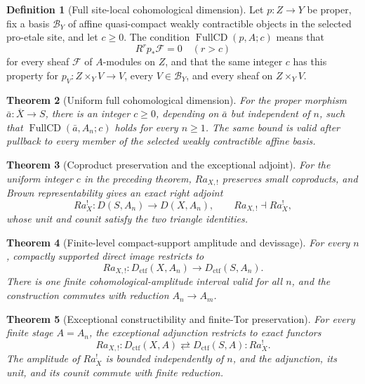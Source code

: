 \documentclass[10pt]{article}
\newtheorem{theorem}{Theorem}[section]
\theoremstyle{definition}
\newtheorem{definition}[theorem]{Definition}
\begin{document}
\begin{definition}[Full site-local cohomological dimension]
Let \(p:Z\to Y\) be proper, fix a basis \(\mathcal B_Y\) of affine
quasi-compact weakly contractible objects in the selected pro-etale site,
and let \(c\ge0\).  The condition \(\operatorname{FullCD}(p,A;c)\) means
that
\[
 R^rp_*\mathcal F=0\quad(r>c)
\]
for every sheaf \(\mathcal F\) of \(A\)-modules on \(Z\), and that the same
integer \(c\) has this property for \(p_V:Z\times_YV\to V\), every
\(V\in\mathcal B_Y\), and every sheaf on \(Z\times_YV\).
\end{definition}

\begin{theorem}[Uniform full cohomological dimension]
For the proper morphism \(\bar a:\overline X\to S\), there is an integer
\(c\geq0\), depending on \(\bar a\) but independent of \(n\), such that
\(\operatorname{FullCD}(\bar a,A_n;c)\) holds for every \(n\geq1\).
The same bound is valid after pullback to every member of the selected
weakly contractible affine basis.
\end{theorem}

\begin{theorem}[Coproduct preservation and the exceptional adjoint]
For the uniform integer \(c\) in the preceding theorem,
\(Ra_{X,!}\) preserves small coproducts,
and Brown representability gives an exact right adjoint
\[
 Ra_X^!:D(S,A_n)\longrightarrow D(X,A_n),
 \qquad Ra_{X,!}\dashv Ra_X^!,
\]
whose unit and counit satisfy the two triangle identities.
\end{theorem}

\begin{theorem}[Finite-level compact-support amplitude and devissage]
For every \(n\), compactly supported direct image restricts to
\[
 Ra_{X,!}:D_{\mathrm{ctf}}(X,A_n)\longrightarrow
          D_{\mathrm{ctf}}(S,A_n).
\]
There is one finite cohomological-amplitude interval valid for all \(n\),
and the construction commutes with reduction \(A_n\to A_m\).
\end{theorem}

\begin{theorem}[Exceptional constructibility and finite-Tor preservation]
For every finite stage \(A=A_n\), the exceptional adjunction
restricts to exact functors
\[
 Ra_{X,!}:D_{\mathrm{ctf}}(X,A)\rightleftarrows
 D_{\mathrm{ctf}}(S,A):Ra_X^!.
\]
The amplitude of \(Ra_X^!\) is bounded independently of \(n\), and the
adjunction, its unit, and its counit commute with finite reduction.
\end{theorem}
\end{document}
